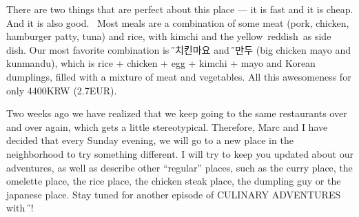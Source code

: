 \begin{post}
\begin{content}
\begin{figure}
\vspace{-12pt}
\raggedleft{}
\vspace{-24pt}
\end{figure}There are two things that are perfect about this place — it is fast and it is cheap. And it is also good.  Most meals are a combination of some meat (pork, chicken, hamburger patty, tuna) and rice, with kimchi and the yellow reddish as side dish. Our most favorite combination is {\H 빅치킨마요} and {\H 군만두} (big chicken mayo and kunmandu), which is rice + chicken + egg + kimchi + mayo and Korean dumplings, filled with a mixture of meat and vegetables. All this awesomeness for only 4400KRW (2.7EUR).

Two weeks ago we have realized that we keep going to the same restaurants over and over again, which gets a little stereotypical. Therefore, Marc and I have decided that every Sunday evening, we will go to a new place in the neighborhood to try something different. I will try to keep you updated about our adventures, as well as describe other ``regular'' places, such as the curry place, the omelette place, the rice place, the chicken steak place, the dumpling guy or the japanese place. Stay tuned for another episode of CULINARY ADVENTURES with {\H 얀}!
\end{content}
\end{post}
